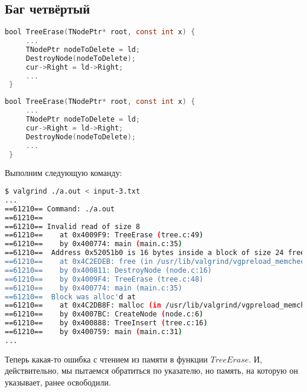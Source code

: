 \documentclass[12pt]{article}
\begin{document}
\subsection{Баг четвёртый}
\begin{lstlisting}[language=C, backgroundcolor=\color{myred}]
 bool TreeErase(TNodePtr* root, const int x) {
     ...
     TNodePtr nodeToDelete = ld;
     DestroyNode(nodeToDelete);
     cur->Right = ld->Right;
     ...
 }
\end{lstlisting}
\begin{lstlisting}[language=C, caption=tree.c, captionpos=b, backgroundcolor=\color{mygreen}]
 bool TreeErase(TNodePtr* root, const int x) {
     ...
     TNodePtr nodeToDelete = ld;
     cur->Right = ld->Right;
     DestroyNode(nodeToDelete);
     ...
 }
\end{lstlisting}
Выполним следующую команду:
\begin{lstlisting}[language=bash, frame=L]
$ valgrind ./a.out < input-3.txt
...
==61210== Command: ./a.out
==61210== 
==61210== Invalid read of size 8
==61210==    at 0x4009F9: TreeErase (tree.c:49)
==61210==    by 0x400774: main (main.c:35)
==61210==  Address 0x52051b0 is 16 bytes inside a block of size 24 free'd
==61210==    at 0x4C2EDEB: free (in /usr/lib/valgrind/vgpreload_memcheck-amd64-linux.so)
==61210==    by 0x400811: DestroyNode (node.c:16)
==61210==    by 0x4009F4: TreeErase (tree.c:48)
==61210==    by 0x400774: main (main.c:35)
==61210==  Block was alloc'd at
==61210==    at 0x4C2DB8F: malloc (in /usr/lib/valgrind/vgpreload_memcheck-amd64-linux.so)
==61210==    by 0x4007BC: CreateNode (node.c:6)
==61210==    by 0x400888: TreeInsert (tree.c:16)
==61210==    by 0x400759: main (main.c:31)
...
\end{lstlisting}
Теперь какая-то ошибка с чтением из памяти в функции $TreeErase$. И, действительно, мы пытаемся обратиться по указателю, но память, на которую он указывает, ранее освободили.

\newpage
\end{document}
